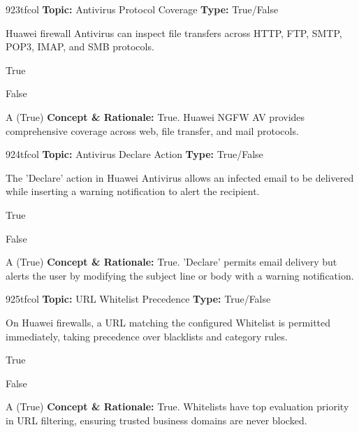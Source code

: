 \begin{qcard}{923}{tfcol}
\textcolor{darkslate!75}{\small\textbf{Topic:} Antivirus Protocol Coverage \hfill \textbf{Type:} True/False}\vspace{0.4em}\par
Huawei firewall Antivirus can inspect file transfers across HTTP, FTP, SMTP, POP3, IMAP, and SMB protocols.
\begin{qoptions}
\item True
\item False
\end{qoptions}
\end{qcard}
\nopagebreak
\begin{explainbox}{A (True)}
\textbf{Concept \& Rationale:} True. Huawei NGFW AV provides comprehensive coverage across web, file transfer, and mail protocols.
\end{explainbox}

\begin{qcard}{924}{tfcol}
\textcolor{darkslate!75}{\small\textbf{Topic:} Antivirus Declare Action \hfill \textbf{Type:} True/False}\vspace{0.4em}\par
The 'Declare' action in Huawei Antivirus allows an infected email to be delivered while inserting a warning notification to alert the recipient.
\begin{qoptions}
\item True
\item False
\end{qoptions}
\end{qcard}
\nopagebreak
\begin{explainbox}{A (True)}
\textbf{Concept \& Rationale:} True. 'Declare' permits email delivery but alerts the user by modifying the subject line or body with a warning notification.
\end{explainbox}

\begin{qcard}{925}{tfcol}
\textcolor{darkslate!75}{\small\textbf{Topic:} URL Whitelist Precedence \hfill \textbf{Type:} True/False}\vspace{0.4em}\par
On Huawei firewalls, a URL matching the configured Whitelist is permitted immediately, taking precedence over blacklists and category rules.
\begin{qoptions}
\item True
\item False
\end{qoptions}
\end{qcard}
\nopagebreak
\begin{explainbox}{A (True)}
\textbf{Concept \& Rationale:} True. Whitelists have top evaluation priority in URL filtering, ensuring trusted business domains are never blocked.
\end{explainbox}

